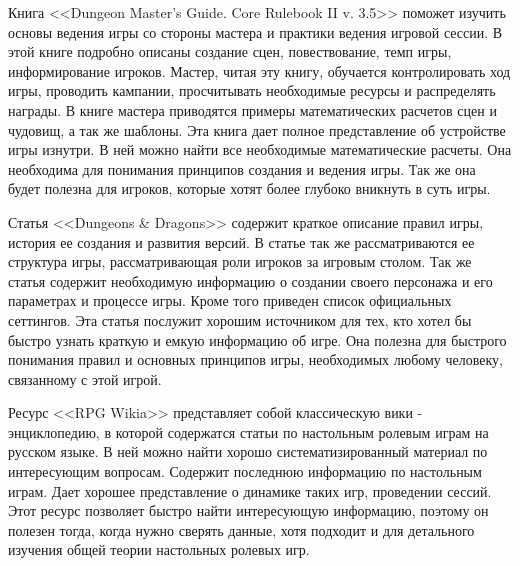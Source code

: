 Книга <<Dungeon Master's Guide. Core Rulebook II v. 3.5>> поможет изучить основы ведения игры со стороны мастера и практики ведения игровой сессии. В этой книге подробно описаны создание сцен, повествование, темп игры, информирование игроков. Мастер, читая эту книгу, обучается контролировать ход игры, проводить кампании, просчитывать необходимые ресурсы и распределять награды. В книге мастера приводятся примеры математических расчетов сцен и чудовищ, а так же шаблоны. Эта книга дает полное представление об устройстве игры изнутри. В ней можно найти все необходимые математические расчеты. Она необходима для понимания принципов создания и ведения игры. Так же она будет полезна для игроков, которые хотят более глубоко вникнуть в суть игры.

Статья <<Dungeons \& Dragons>> содержит краткое описание правил игры, история ее создания и развития версий. В статье так же рассматриваются ее структура игры, рассматривающая роли игроков за игровым столом. Так же статья содержит необходимую информацию о создании своего персонажа и его параметрах и процессе игры. Кроме того приведен список официальных сеттингов. Эта статья послужит хорошим источником для тех, кто хотел бы быстро узнать краткую и емкую информацию об игре. Она полезна для быстрого понимания правил и основных принципов игры, необходимых любому человеку, связанному с этой игрой.

Ресурс <<RPG Wikia>> представляет собой классическую вики - энциклопедию, в которой содержатся статьи по настольным ролевым играм на русском языке. В ней можно найти хорошо систематизированный материал по интересующим вопросам. Содержит последнюю информацию по настольным играм. Дает хорошее представление о динамике таких игр, проведении сессий. Этот ресурс позволяет быстро найти интересующую информацию, поэтому он полезен тогда, когда нужно сверять данные, хотя подходит и для детального изучения общей теории настольных ролевых игр.

\pagebreak
